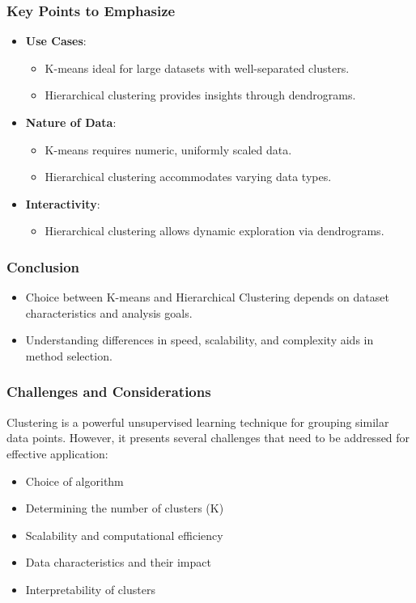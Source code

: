 \documentclass{beamer}
\begin{document}
\begin{frame}[fragile]
    \frametitle{Key Points to Emphasize}
    \begin{itemize}
        \item \textbf{Use Cases}:
        \begin{itemize}
            \item K-means ideal for large datasets with well-separated clusters.
            \item Hierarchical clustering provides insights through dendrograms.
        \end{itemize}
        
        \item \textbf{Nature of Data}:
        \begin{itemize}
            \item K-means requires numeric, uniformly scaled data.
            \item Hierarchical clustering accommodates varying data types.
        \end{itemize}

        \item \textbf{Interactivity}:
        \begin{itemize}
            \item Hierarchical clustering allows dynamic exploration via dendrograms.
        \end{itemize}
    \end{itemize}
\end{frame}

\begin{frame}[fragile]
    \frametitle{Conclusion}
    \begin{itemize}
        \item Choice between K-means and Hierarchical Clustering depends on dataset characteristics and analysis goals.
        \item Understanding differences in speed, scalability, and complexity aids in method selection.
    \end{itemize}
\end{frame}

\begin{frame}[fragile]
    \frametitle{Challenges and Considerations}
    Clustering is a powerful unsupervised learning technique for grouping similar data points. 
    However, it presents several challenges that need to be addressed for effective application:
    \begin{itemize}
        \item Choice of algorithm
        \item Determining the number of clusters (K)
        \item Scalability and computational efficiency
        \item Data characteristics and their impact
        \item Interpretability of clusters
    \end{itemize}
\end{frame}
\end{document}
